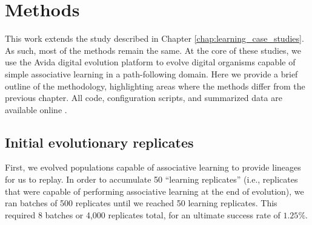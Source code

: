 

\section{Methods}

This work extends the study described in Chapter \ref{chap:learning_case_studies}. 
As such, most of the methods remain the same. 
At the core of these studies, we use the Avida digital evolution platform \citep{ofriaAvidaSoftwarePlatform2004a} to evolve digital organisms capable of simple associative learning in a path-following domain.  
Here we provide a brief outline of the methodology, highlighting areas where the methods differ from the previous chapter. 
All code, configuration scripts, and summarized data are available online \citep{fergusonFergusonAJReplayingEvolution2023}.

\subsection{Initial evolutionary replicates}

First, we evolved populations capable of associative learning to provide lineages for us to replay. 
In order to accumulate 50 ``learning replicates'' (i.e., replicates that were capable of performing associative learning at the end of evolution), we ran batches of 500 replicates until we reached 50 learning replicates. 
This required 8 batches or 4,000 replicates total, for an ultimate success rate of $1.25\%$. 

